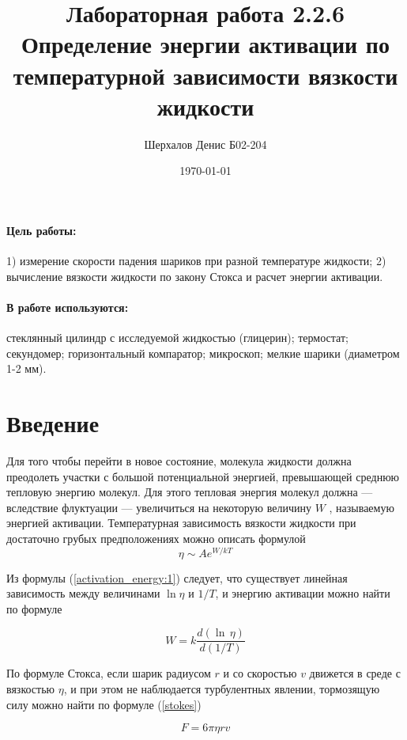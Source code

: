 \documentclass[a4paper,12pt]{article}
\author{Шерхалов Денис Б02-204}
\title{Лабораторная работа 2.2.6 \\
	\textbf{Определение энергии активации по температурной зависимости вязкости жидкости}}
\date{\today}
\begin{document}
	
	{\Large \maketitle}

	\paragraph*{Цель работы:} 1) измерение скорости падения шариков при разной температуре жидкости; 2) вычисление вязкости жидкости по закону Стокса и расчет энергии активации.
	
	\paragraph*{В работе используются:} стеклянный цилиндр с исследуемой жидкостью (глицерин); термостат; секундомер; горизонтальный компаратор; микроскоп; мелкие шарики (диаметром 1-2 мм).
	
	\section{Введение}
	Для того чтобы перейти в новое состояние, молекула жидкости должна преодолеть участки с большой потенциальной энергией, превышающей среднюю тепловую энергию молекул. Для этого тепловая энергия молекул должна — вследствие флуктуации — увеличиться на некоторую величину $W$ , называемую энергией активации. Температурная зависимость вязкости жидкости при достаточно грубых предположениях можно описать формулой
	\begin{equation} \label{activation_energy:1}
		\eta \sim A e^{W/kT}
	\end{equation}
	
	Из формулы (\ref{activation_energy:1}) следует, что существует линейная зависимость между величинами $\ln\eta$ и $1/T$, и энергию активации можно найти по формуле
	
	\begin{equation} \label{activation_energy:2}
		W = k \frac{d(\ln\, \eta)}{d(1/T)}
	\end{equation}
	
	По формуле Стокса, если шарик радиусом $r$ и со скоростью $v$ движется в среде с вязкостью $\eta$, и при этом не наблюдается турбулентных явлении, тормозящую силу можно найти по формуле (\ref{stokes})
	
	\begin{equation}\label{stokes}
		F = 6\pi\eta rv
	\end{equation}
	
\end{document}
